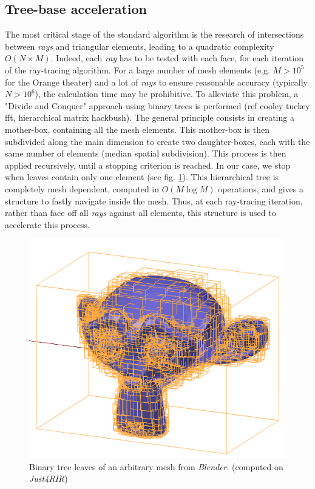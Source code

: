 \documentclass[AMA,STIX1COL]{WileyNJD-v2}
\begin{document}
\subsection{Tree-base acceleration}
\label{octree}
The most critical stage of the standard algorithm is the research of intersections between  \textit{rays} and triangular elements, leading to a quadratic complexity $O(N\times M)$. Indeed, each \textit{ray} has to be tested with each face, for each iteration of the ray-tracing algorithm. For a large number of mesh elements (e.g. $M>10^5$ for the Orange theater) and a lot of \textit{rays} to ensure reasonable accuracy (typically $N>10^6$), the calculation time may be prohibitive. To alleviate this problem, a "Divide and Conquer" approach using binary trees is performed (ref cooley tuckey fft, hierarchical matrix hackbush). The general principle consists in creating a mother-box, containing all the mesh elements. This mother-box is then subdivided along the main dimension to create two daughter-boxes, each with the same number of elements (median spatial subdivision). This process is then applied recursively, until a stopping criterion is reached. In our case, we stop when leaves contain only one element (see fig. \ref{octreeSuzanne}). This hierarchical tree is completely mesh dependent, computed in $O(M\log M)$ operations, and gives a structure to fastly navigate inside the mesh. Thus, at each ray-tracing iteration, rather than face off all \textit{rays} against all elements, this structure is used to accelerate this process. 

\begin{figure}[t]
\centering
		\includegraphics[width=0.4\linewidth]{octreeSuzanne}
		\caption{Binary tree leaves of an arbitrary mesh from \textit{Blender}. (computed on \textit{Just4RIR})}
		\label{octreeSuzanne}
\end{figure}
\end{document}
